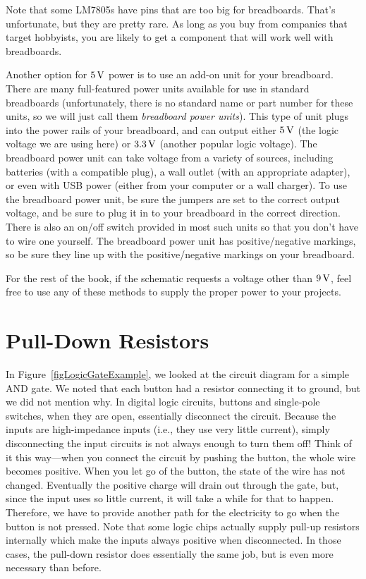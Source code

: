 Note that some LM7805s have pins that are too big for breadboards.
That's unfortunate, but they are pretty rare.  
As long as you buy from companies that target hobbyists, you are likely to get a component that will work well with breadboards.

Another option for $5\,\si{\volt}$ power is to use an add-on unit for your breadboard.
There are many full-featured power units available for use in standard breadboards (unfortunately, there is no standard name or part number for these units, so we will just call them \emph{breadboard power units}).
This type of unit plugs into the power rails of your breadboard, and can output either $5\,\si{\volt}$ (the logic voltage we are using here) or $3.3\,\si{\volt}$ (another popular logic voltage).
The breadboard power unit can take voltage from a variety of sources, including batteries (with a compatible plug), a wall outlet (with an appropriate adapter), or even with USB power (either from your computer or a wall charger).
To use the breadboard power unit, be sure the jumpers are set to the correct output voltage, and be sure to plug it in to your breadboard in the correct direction.  
There is also an on/off switch provided in most such units so that you don't have to wire one yourself.
The breadboard power unit has positive/negative markings, so be sure they line up with the positive/negative markings on your breadboard.


For the rest of the book, if the schematic requests a voltage other than $9\,\si{\volt}$, feel free to use any of these methods to supply the proper power to your projects.

\section{Pull-Down Resistors}
\label{secPullDownResistors}

In Figure~\ref{figLogicGateExample}, we looked at the circuit diagram for a simple AND gate.  
We noted that each button had a resistor connecting it to ground, but we did not mention why.
In digital logic circuits, buttons and single-pole switches, when they are open, essentially disconnect the circuit.
Because the inputs are high-impedance inputs (i.e., they use very little current), simply disconnecting the input circuits is not always enough to turn them off!
Think of it this way---when you connect the circuit by pushing the button, the whole wire becomes positive.
When you let go of the button, the state of the wire has not changed.
Eventually the positive charge will drain out through the gate, but, since the input uses so little current, it will take a while for that to happen.
Therefore, we have to provide another path for the electricity to go when the button is not pressed.
Note that some logic chips actually supply pull-up resistors internally which make the inputs always positive when disconnected.  
In those cases, the pull-down resistor does essentially the same job, but is even more necessary than before.

